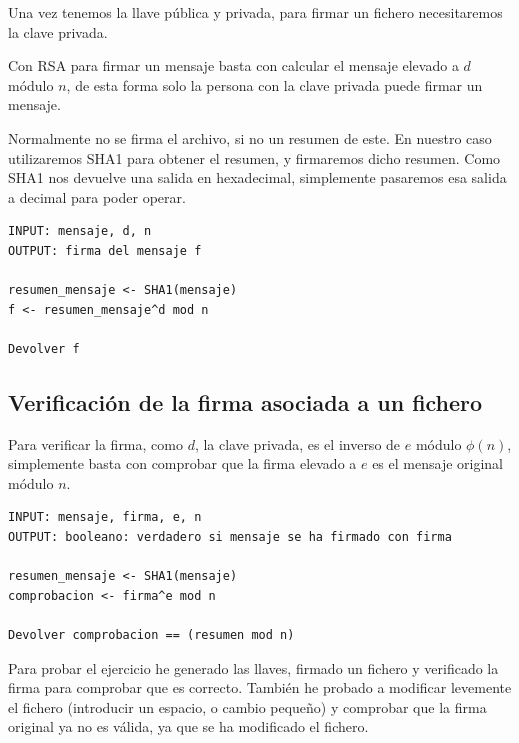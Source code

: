 \documentclass[12pt, spanish]{article}
\begin{document}
Una vez tenemos la llave pública y privada, para firmar un fichero necesitaremos la clave privada.

Con RSA para firmar un mensaje basta con calcular el mensaje elevado a $d$ módulo $n$, de esta forma solo la persona con la clave privada puede firmar un mensaje.

Normalmente no se firma el archivo, si no un resumen de este. En nuestro caso utilizaremos SHA1 para obtener el resumen, y firmaremos dicho resumen. Como SHA1 nos devuelve una salida en hexadecimal, simplemente pasaremos esa salida a decimal para poder operar.

\begin{lstlisting}[caption={Firmar mensaje RSA}]
INPUT: mensaje, d, n
OUTPUT: firma del mensaje f

resumen_mensaje <- SHA1(mensaje)
f <- resumen_mensaje^d mod n

Devolver f
\end{lstlisting}


\subsection{Verificación de la firma asociada a un fichero}

Para verificar la firma, como $d$, la clave privada, es el inverso de $e$ módulo $\phi(n)$, simplemente basta con comprobar que la firma elevado a $e$ es el mensaje original módulo $n$.

\begin{lstlisting}[caption={Verificar mensaje RSA}]
INPUT: mensaje, firma, e, n
OUTPUT: booleano: verdadero si mensaje se ha firmado con firma

resumen_mensaje <- SHA1(mensaje)
comprobacion <- firma^e mod n

Devolver comprobacion == (resumen mod n)
\end{lstlisting}


Para probar el ejercicio he generado las llaves, firmado un fichero y verificado la firma para comprobar que es correcto. También he probado a modificar levemente el fichero (introducir un espacio, o cambio pequeño) y comprobar que la firma original ya no es válida, ya que se ha modificado el fichero.
\end{document}
